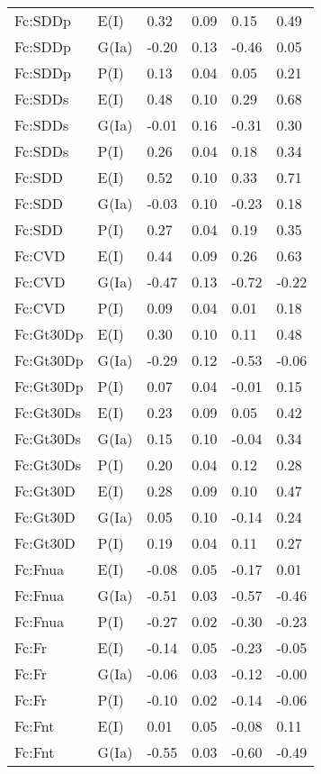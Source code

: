 \begin{center}
\begin{longtable}{|p{1.1in}|p{0.7in}|p{0.7in}|p{0.6in}|p{0.6in}|p{0.6in}|}
  Fc:SDDp & E(I) & 0.32 & 0.09 & 0.15 & 0.49 \\ 
  Fc:SDDp & G(Ia) & -0.20 & 0.13 & -0.46 & 0.05 \\ 
  Fc:SDDp & P(I) & 0.13 & 0.04 & 0.05 & 0.21 \\ 
  Fc:SDDs & E(I) & 0.48 & 0.10 & 0.29 & 0.68 \\ 
  Fc:SDDs & G(Ia) & -0.01 & 0.16 & -0.31 & 0.30 \\ 
  Fc:SDDs & P(I) & 0.26 & 0.04 & 0.18 & 0.34 \\ 
  Fc:SDD & E(I) & 0.52 & 0.10 & 0.33 & 0.71 \\ 
  Fc:SDD & G(Ia) & -0.03 & 0.10 & -0.23 & 0.18 \\ 
  Fc:SDD & P(I) & 0.27 & 0.04 & 0.19 & 0.35 \\ 
  Fc:CVD & E(I) & 0.44 & 0.09 & 0.26 & 0.63 \\ 
  Fc:CVD & G(Ia) & -0.47 & 0.13 & -0.72 & -0.22 \\ 
  Fc:CVD & P(I) & 0.09 & 0.04 & 0.01 & 0.18 \\ 
  Fc:Gt30Dp & E(I) & 0.30 & 0.10 & 0.11 & 0.48 \\ 
  Fc:Gt30Dp & G(Ia) & -0.29 & 0.12 & -0.53 & -0.06 \\ 
  Fc:Gt30Dp & P(I) & 0.07 & 0.04 & -0.01 & 0.15 \\ 
  Fc:Gt30Ds & E(I) & 0.23 & 0.09 & 0.05 & 0.42 \\ 
  Fc:Gt30Ds & G(Ia) & 0.15 & 0.10 & -0.04 & 0.34 \\ 
  Fc:Gt30Ds & P(I) & 0.20 & 0.04 & 0.12 & 0.28 \\ 
  Fc:Gt30D & E(I) & 0.28 & 0.09 & 0.10 & 0.47 \\ 
  Fc:Gt30D & G(Ia) & 0.05 & 0.10 & -0.14 & 0.24 \\ 
  Fc:Gt30D & P(I) & 0.19 & 0.04 & 0.11 & 0.27 \\ 
  Fc:Fnua & E(I) & -0.08 & 0.05 & -0.17 & 0.01 \\ 
  Fc:Fnua & G(Ia) & -0.51 & 0.03 & -0.57 & -0.46 \\ 
  Fc:Fnua & P(I) & -0.27 & 0.02 & -0.30 & -0.23 \\ 
  Fc:Fr & E(I) & -0.14 & 0.05 & -0.23 & -0.05 \\ 
  Fc:Fr & G(Ia) & -0.06 & 0.03 & -0.12 & -0.00 \\ 
  Fc:Fr & P(I) & -0.10 & 0.02 & -0.14 & -0.06 \\ 
  Fc:Fnt & E(I) & 0.01 & 0.05 & -0.08 & 0.11 \\ 
  Fc:Fnt & G(Ia) & -0.55 & 0.03 & -0.60 & -0.49 \\ 

\end{longtable}
\end{center}

